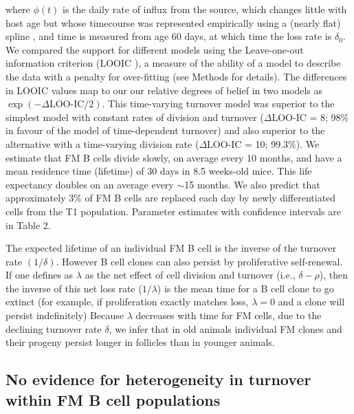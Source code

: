 \documentclass[11pt,onecolumn]{article}
\newcommand{\red}[1]{{\color{red}{#1}}}
\newcommand{\looic}{\ensuremath{\Delta \text{LOO-IC}}}
\begin{document}
{	where $\phi(t)$ is the daily rate of influx from the source, which changes little with host age but whose timecourse was represented empirically using a (nearly flat) spline \red{NEEDS REF TO A FIGURE}, and time is measured from age 60 days, at which time the loss rate is $\delta_{0}$. \red{could cut this text following but nobody reading this will have any idea what LOOIC is so it needs a bit of explanation somewhere!}We compared the support for different models using the Leave-one-out information criterion (LOOIC \red{citation}), a measure of the ability of a model to describe the data with a penalty for over-fitting (see Methods for details).  The differences in LOOIC values map to our our relative degrees of belief in two models as $\exp( -{ \looic} /2)$. This time-varying turnover model was superior to the simplest model with constant rates of division and turnover ({\looic} = 8; 98\% in favour of the model of time-dependent turnover) and also superior to the alternative with a time-varying division rate ({\looic} = 10; 99.3\%). We estimate that FM B cells divide slowly, on average every 10 months,  and have a mean residence time (lifetime) of 30 days in 8.5 weeks-old mice. This life expectancy doubles on an average every $\sim$15 months.
	We also predict that approximately 3\% of FM B cells are replaced each day by newly differentiated cells from the T1 population. Parameter estimates with confidence intervals are in Table 2.
	
	The expected lifetime of an individual FM B cell is the inverse of the turnover rate $(1/\delta)$. However B cell clones can also persist by proliferative self-renewal. If one defines as $\lambda$ as the net effect of cell division and turnover (i.e., $\delta - \rho$), then the inverse of this net loss rate ($1/\lambda$) is the mean time for a B cell clone to go extinct (for example, if proliferation exactly matches loss, $\lambda=0$ and a clone will persist indefinitely) Because $\lambda$ decreases with time for FM cells, due to the declining turnover rate $\delta$, we infer that in old animals individual FM clones and their progeny  persist longer in follicles than in younger animals.
	
	
	
	\subsection*{No evidence for heterogeneity in turnover within FM B cell populations}
	
}
\end{document}
